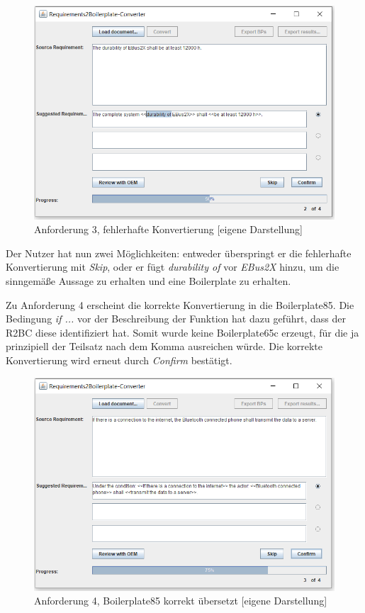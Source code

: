 \documentclass[12pt]{report}
\begin{document}
\begin{figure}[h!]
\begin{center}
\includegraphics[scale=0.7]{Bilder/GUI-req3.png}
\caption{Anforderung 3, fehlerhafte Konvertierung [eigene Darstellung]}
\end{center}
\end{figure}

Der Nutzer hat nun zwei Möglichkeiten: entweder überspringt er die fehlerhafte Konvertierung mit \textit{Skip}, oder er fügt \textit{durability of} vor \textit{EBus2X} hinzu, um die sinngemäße Aussage zu erhalten und eine Boilerplate zu erhalten.

Zu Anforderung 4 erscheint die korrekte Konvertierung in die Boilerplate85. Die Bedingung \textit{if ...} vor der Beschreibung der Funktion hat dazu geführt, dass der R2BC diese identifiziert hat. Somit wurde keine Boilerplate65c erzeugt, für die ja prinzipiell der Teilsatz nach dem Komma ausreichen würde.
Die korrekte Konvertierung wird erneut durch \textit{Confirm} bestätigt.

\begin{figure}[h!]
\begin{center}
\includegraphics[scale=0.7]{Bilder/GUI-req4.png}
\caption{Anforderung 4, Boilerplate85 korrekt übersetzt [eigene Darstellung]}
\end{center}
\end{figure}
\end{document}
